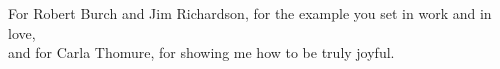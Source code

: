 For Robert Burch and Jim Richardson, for the example you set in work and in love,\\
    
and for Carla Thomure, for showing me how to be truly joyful.
